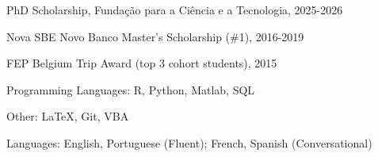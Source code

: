 \documentclass{practical-resume}
\begin{document}
\begin{position}{}{}{}
	\item PhD Scholarship, Fundação para a Ciência e a Tecnologia, 2025-2026
	\item Nova SBE Novo Banco Master's Scholarship (\#1), 2016-2019
	\item FEP Belgium Trip Award (top 3 cohort students), 2015
\end{position}
	
\vspace{-1em}
	Programming Languages: R, Python, Matlab, SQL
	
	Other: \LaTeX, Git, VBA
	
	Languages: English, Portuguese (Fluent); French, Spanish (Conversational)
		
\end{document}
